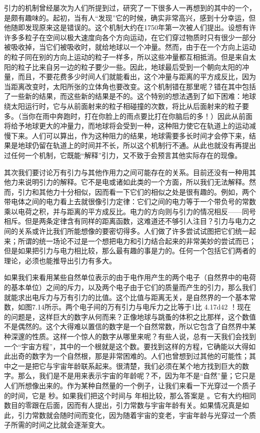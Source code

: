 引力的机制曾经屡次为人们所提到过，研究了一下很多人一再想到的其中的一个，是颇有趣味的。起初，当有人“发现”它的时候，确实非常高兴，感到十分幸运，但他随即发现原来这是错误的。这个机制大约在1750年第一次被人们提出。设想有许许多多粒子在空间以极大速度向各个方向运动，在它们穿过物质时只有很少一部分被吸收掉，当它们被吸收时，就给地球以一个冲量。然而，由于在一个方向上运动的粒子同在别的方向上运动的粒子一样多，所以这些冲量都互相抵消。但是来自太阳的粒子比来自另一边的粒子要少一些。因此，地球最后受到一个朝向太阳的冲量，而且，不要花费多少时间人们就能看出，这个冲量与距离的平方成反比，因为当距离改变时，太阳所张的立体角也要改变。这个机制错在那里呢？错在其中包括了一些新的结果，而这些新的结果是不的。这个特别的想法遇到了如下困难：地球绕太阳运行时，它与从前面射来的粒子相碰撞的次数，将比从后面射来的粒子要多。（当你在雨中奔跑时，打在你脸上的雨点要比打在你脑后的多！）因此从前面将给予地球更大的冲量力，而地球将会受到一种，这种阻力使它在轨道上的运动减慢下来。人们可以算出，作为这种阻力的结果，地球需要多长时间才会停下来，结果是地球仍留在轨道上的时间并不长，所以这个机制行不通。从此也就没有再提出过任何一个机制，它既能“解释”引力，又不致于会预言其他实际存在的现像。

其次我们要讨论万有引力与其他作用力之间可能存在的关系。目前还没有一种用其他力来说明引力的解释。它不是电或诸如此类的一个方面，所以我们无法解释。然而，引力和其他力十分相似，因而看一下它们的相似之处是很有趣的。例如，两个带电体之间的电力看上去就很像引力定律：它们之间的电力等于一个带负号的常数乘以电荷之积，并与距离的平方成反比。电力的方向则与引力的情况相反——同号相斥。但是两条定律含有同样的距离函数，这难道还不够引人注目？引力与电力之间的关系或许比我们所能想像的要密切得多。人们做了许多尝试试图把它们统一起来；所谓的统一场论不过是一个想把电力和引力结合起来的非常美妙的尝试而已；但是如果把引力与电力相比较，那么最有趣的事是力的。任何一个包括它们两者的理论，必须也能推导出引力有多大。

如果我们来看用某些自然单位表示的由于电作用产生的两个电子（自然界中的电荷的基本单位）之间的斥力，以及两个电子由于它们的质量而产生的引力，那么我们就能求出电斥力与万有引力的比值。这个比值与距离无关，是自然界的一个基本常数，如图7.14所示。两个电子间的万有引力与电斥力之比等于1比 \num{4.17d42} ！现在的问题是，这样巨大的数字从何而来？正像地球与跳蚤的体积之比那样，这个数值不是偶然的。这个大得难以置信的数字是一个自然常数，所以它包含了自然界中某种深邃的性质。这样一个惊人的数字从哪里来呢？有些人说，总有一天我们会找到一个“宇宙方程”，其中的一个根就是这个数。要找到这样的方程，它确能以大得如此出奇的数字为一个自然根，那是非常困难的。人们也曾想到过其他的可能性；其中之一是把它与宇宙年龄联系起来。很清楚，我们必须在某个地方找到巨大的数字。那么，我们是不是用来表示宇宙的年龄呢？不，因为年不是“自然”量；它只是人们所想像出来的。作为某种自然量的一个例子，让我们来看一下光穿过一个质子的时间，它是 秒。如果我们把这个时间与  年相比较，那么答案是 。它有大约相同数目的零跟在后面，因而有人提出，引力常数与宇宙年龄有关。如果情况真是如此，引力常数就会随时间而变化，因为随着宇宙的变老，宇宙年龄与光穿过一个质子所需的时间之比就会逐渐变大。

